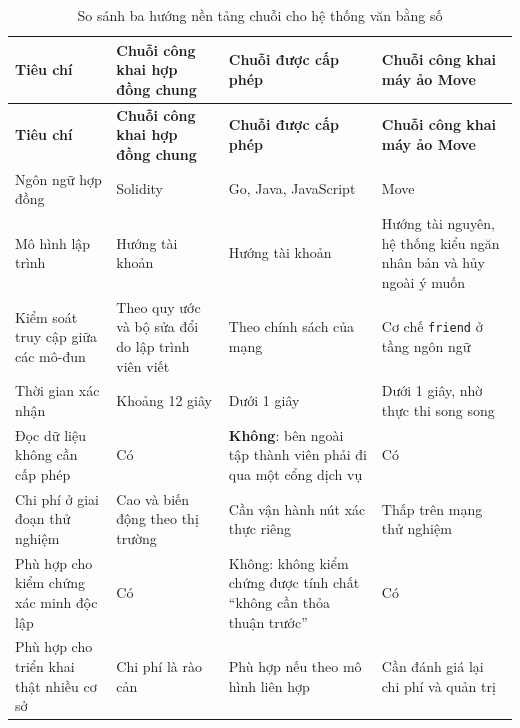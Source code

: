 \begin{longtable}{|p{3.3cm}|p{3.3cm}|p{3.3cm}|p{3.3cm}|}
\caption{So sánh ba hướng nền tảng chuỗi cho hệ thống văn bằng số}
\label{tab:blockchain-comparison} \\
\hline
\textbf{Tiêu chí} & \textbf{Chuỗi công khai hợp đồng chung} & \textbf{Chuỗi được cấp phép} & \textbf{Chuỗi công khai máy ảo Move} \\
\hline
\endfirsthead

\hline
\textbf{Tiêu chí} & \textbf{Chuỗi công khai hợp đồng chung} & \textbf{Chuỗi được cấp phép} & \textbf{Chuỗi công khai máy ảo Move} \\
\hline
\endhead

\hline
\endfoot

\hline
\endlastfoot

Ngôn ngữ hợp đồng
& Solidity
& Go, Java, JavaScript
& Move
\\ \hline

Mô hình lập trình
& Hướng tài khoản
& Hướng tài khoản
& Hướng tài nguyên, hệ thống kiểu ngăn nhân bản và hủy ngoài ý muốn
\\ \hline

Kiểm soát truy cập giữa các mô-đun
& Theo quy ước và bộ sửa đổi do lập trình viên viết
& Theo chính sách của mạng
& Cơ chế \texttt{friend} ở tầng ngôn ngữ
\\ \hline

Thời gian xác nhận
& Khoảng 12 giây
& Dưới 1 giây
& Dưới 1 giây, nhờ thực thi song song
\\ \hline

Đọc dữ liệu không cần cấp phép
& Có
& \textbf{Không}: bên ngoài tập thành viên phải đi qua một cổng dịch vụ
& Có
\\ \hline

Chi phí ở giai đoạn thử nghiệm
& Cao và biến động theo thị trường
& Cần vận hành nút xác thực riêng
& Thấp trên mạng thử nghiệm
\\ \hline

Phù hợp cho kiểm chứng xác minh độc lập
& Có
& Không: không kiểm chứng được tính chất {``}không cần thỏa thuận trước{''}
& Có
\\ \hline

Phù hợp cho triển khai thật nhiều cơ sở
& Chi phí là rào cản
& Phù hợp nếu theo mô hình liên hợp
& Cần đánh giá lại chi phí và quản trị
\\ \hline

\end{longtable}
